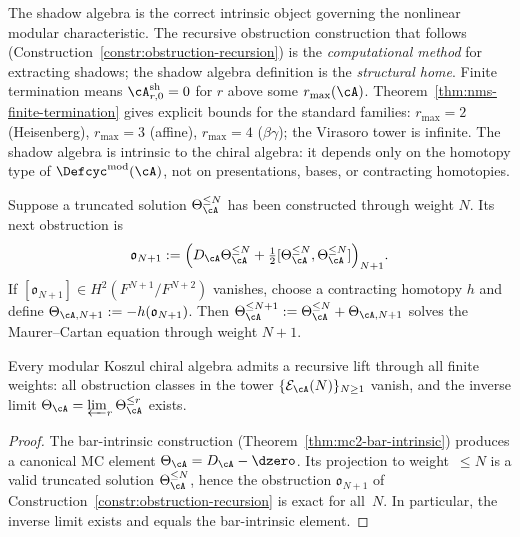 \begin{remark}
\label{rem:shadow-algebra-structural-home}
The shadow algebra is the correct intrinsic object governing
the nonlinear modular characteristic.  The recursive obstruction
construction that follows (Construction~\ref{constr:obstruction-recursion})
is the \emph{computational method} for extracting shadows; the
shadow algebra definition is the \emph{structural home}.  Finite termination means
$\cA^{\mathrm{sh}}_{r,0} = 0$ for $r$ above some
$r_{\max}(\cA)$.  Theorem~\ref{thm:nms-finite-termination} gives
explicit bounds for the standard families: $r_{\max} = 2$
(Heisenberg), $r_{\max} = 3$ (affine), $r_{\max} = 4$
($\beta\gamma$); the Virasoro tower is infinite.
The shadow algebra is intrinsic to the chiral algebra: it depends only on the homotopy type of $\Defcyc^{\mathrm{mod}}(\cA)$, not on presentations, bases, or contracting homotopies.
\end{remark}

\begin{construction}
\label{constr:obstruction-recursion}
Suppose a truncated solution $\Theta_{\cA}^{\leq N}$ has been
constructed through weight $N$.  Its next obstruction is
\begin{equation}
\label{eq:next-obstruction}
\mathfrak{o}_{N+1}
:=
\Bigl(
D_{\cA}\Theta_{\cA}^{\leq N}
+ \tfrac12[\Theta_{\cA}^{\leq N},
\Theta_{\cA}^{\leq N}]
\Bigr)_{N+1}.
\end{equation}
If $[\mathfrak{o}_{N+1}] \in H^2(F^{N+1}/F^{N+2})$ vanishes,
choose a contracting homotopy $h$ and define
$\Theta_{\cA,N+1} := -h(\mathfrak{o}_{N+1})$.
Then $\Theta_{\cA}^{\leq N+1} := \Theta_{\cA}^{\leq N}
+ \Theta_{\cA,N+1}$ solves the Maurer--Cartan equation through
weight $N+1$.
\end{construction}

\begin{theorem}
\label{thm:recursive-existence}
\label{conj:recursive-existence}
Every modular Koszul chiral algebra admits a
recursive lift through all finite weights: all
obstruction classes in the tower
$\{\mathcal{E}_{\cA}(N)\}_{N \geq 1}$ vanish,
and the inverse limit
$\Theta_\cA = \varprojlim_r \Theta_\cA^{\leq r}$
exists.
\end{theorem}

\begin{proof}
The bar-intrinsic construction
(Theorem~\ref{thm:mc2-bar-intrinsic}) produces a
canonical MC element $\Theta_\cA = D_\cA - \dzero$.
Its projection to weight~${\leq}N$ is a valid truncated
solution $\Theta_\cA^{\leq N}$, hence the
obstruction $\mathfrak{o}_{N+1}$ of
Construction~\ref{constr:obstruction-recursion}
is exact for all~$N$.  In particular, the inverse limit exists
and equals the bar-intrinsic element.
\end{proof}

